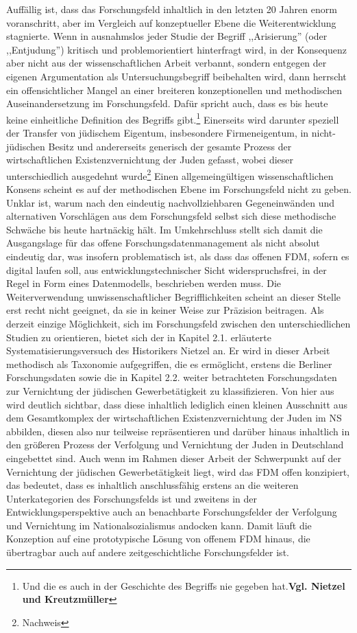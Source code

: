 Auffällig ist, dass das Forschungsfeld inhaltlich in den letzten 20 Jahren enorm voranschritt, aber im Vergleich auf konzeptueller Ebene die Weiterentwicklung stagnierte. Wenn in ausnahmslos jeder Studie der Begriff ,,Arisierung'' (oder ,,Entjudung'') kritisch und problemorientiert hinterfragt wird, in der Konsequenz aber nicht aus der wissenschaftlichen Arbeit verbannt, sondern entgegen der eigenen Argumentation als Untersuchungsbegriff beibehalten wird, dann herrscht ein offensichtlicher Mangel an einer breiteren konzeptionellen und methodischen Auseinandersetzung im Forschungsfeld. Dafür spricht auch, dass es bis heute keine einheitliche Definition des Begriffs gibt.\footnote{Und die es auch in der Geschichte des Begriffs nie gegeben hat.\textbf{Vgl. Nietzel und Kreutzmüller}} Einerseits wird darunter speziell der Transfer von jüdischem Eigentum, insbesondere Firmeneigentum, in nicht-jüdischen Besitz und andererseits generisch der gesamte Prozess der wirtschaftlichen Existenzvernichtung der Juden gefasst, wobei dieser unterschiedlich ausgedehnt wurde\footnote{Nachweis} Einen allgemeingültigen wissenschaftlichen Konsens scheint es auf der methodischen Ebene im Forschungsfeld nicht zu geben. Unklar ist, warum nach den eindeutig nachvollziehbaren Gegeneinwänden und alternativen Vorschlägen aus dem Forschungsfeld selbst sich diese methodische Schwäche bis heute hartnäckig hält. 
Im Umkehrschluss stellt sich damit die Ausgangslage für das offene Forschungsdatenmanagement als nicht absolut eindeutig dar, was insofern problematisch ist, als dass das offenen FDM, sofern es digital laufen soll, aus entwicklungstechnischer Sicht widerspruchsfrei, in der Regel in Form eines Datenmodells, beschrieben werden muss. Die Weiterverwendung unwissenschaftlicher Begrifflichkeiten scheint an dieser Stelle erst recht nicht geeignet, da sie in keiner Weise zur Präzision beitragen. Als derzeit einzige Möglichkeit, sich im Forschungsfeld zwischen den unterschiedlichen Studien zu orientieren, bietet sich der in Kapitel 2.1. erläuterte Systematisierungsversuch des Historikers Nietzel an. Er wird in dieser Arbeit methodisch als Taxonomie aufgegriffen, die es ermöglicht, erstens die Berliner Forschungsdaten sowie die in Kapitel 2.2. weiter betrachteten Forschungsdaten zur Vernichtung der jüdischen Gewerbetätigkeit zu klassifizieren. Von hier aus wird deutlich sichtbar, dass diese inhaltlich lediglich einen kleinen Ausschnitt aus dem Gesamtkomplex der wirtschaftlichen Existenzvernichtung der Juden im NS abbilden, diesen also nur teilweise repräsentieren und darüber hinaus inhaltlich in den größeren Prozess der Verfolgung und Vernichtung der Juden in Deutschland eingebettet sind. Auch wenn im Rahmen dieser Arbeit der Schwerpunkt auf der Vernichtung der jüdischen Gewerbetätigkeit liegt, wird das FDM offen konzipiert, das bedeutet, dass es inhaltlich anschlussfähig erstens an die weiteren Unterkategorien des Forschungsfelds ist und zweitens in der Entwicklungsperspektive auch an benachbarte Forschungsfelder der Verfolgung und Vernichtung im Nationalsozialismus andocken kann. Damit läuft die Konzeption auf eine prototypische Lösung von offenem FDM hinaus, die übertragbar auch auf andere zeitgeschichtliche Forschungsfelder ist.

